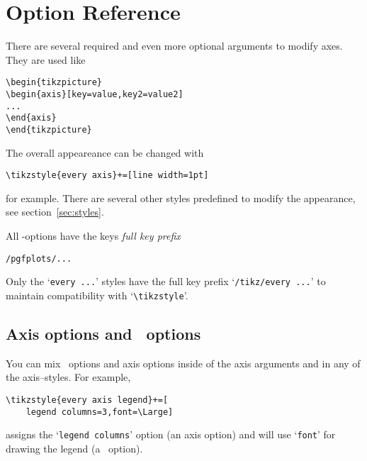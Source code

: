 % 
\section{Option Reference}
There are several required and even more optional arguments to modify axes. They are used like
\begin{lstlisting}
\begin{tikzpicture}
\begin{axis}[key=value,key2=value2]
...
\end{axis}
\end{tikzpicture}
\end{lstlisting}
The overall appeareance can be changed with
\begin{lstlisting}
\tikzstyle{every axis}+=[line width=1pt]
\end{lstlisting}
for example. There are several other styles predefined to modify the appearance, see section~\ref{sec:styles}.

All \PGFPlots-options have the {\PGF}keys \emph{full key prefix}
\begin{lstlisting}
/pgfplots/...
\end{lstlisting}
Only the `\texttt{every ...}' styles have the full key prefix `\texttt{/tikz/every ...}' to maintain compatibility with `\lstinline!\tikzstyle!'.


\subsection{Axis options and \Tikz\ options}
You can mix \Tikz\ options and axis options inside of the axis arguments and in any of the axis--styles. For example,
\begin{lstlisting}
\tikzstyle{every axis legend}+=[
	legend columns=3,font=\Large]
\end{lstlisting}
assigns the `\texttt{legend columns}' option (an axis option) and will use `\texttt{font}' for drawing the legend (a \Tikz\ option).


